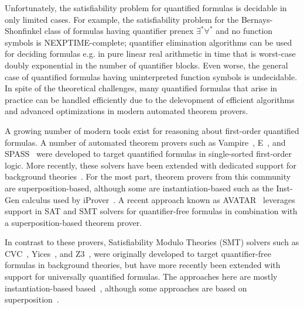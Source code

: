 \documentclass[oribibl]{llncs}
\begin{document}
Unfortunately, the satisfiability problem for quantified formulas is decidable in only limited cases.
For example,
the satisfiability problem for the Bernays-Shonfinkel class of formulas
having quantifier prenex $\exists^\ast \forall^\ast$ and no function symbols
is NEXPTIME-complete;
quantifier elimination algorithms can be used for deciding 
formulas e.g. in pure linear real arithmetic in time that is worst-case doubly exponential in the number of quantifier blocks.
Even worse, the general case of quantified formulas having uninterpreted function symbols is undecidable.
In spite of the theoretical challenges, many quantified formulas that arise in practice
can be handled efficiently due to the delevopment of efficient algorithms 
and advanced optimizations in modern automated theorem provers.

A growing number of modern tools exist for reasoning about first-order quantified formulas.
A number of automated theorem provers
such as Vampire~\cite{DBLP:conf/cav/KovacsV13}, E~\cite{schulz2002brainiac}, and SPASS~\cite{weidenbach2009spass}
were developed to target quantified formulas in single-sorted first-order logic.
More recently, these solvers have been extended with dedicated support for background theories~\cite{DBLP:conf/frocos/AlthausKW09,DBLP:conf/cade/BaumgartnerBW15}.
For the most part, theorem provers from this community are superposition-based,
although some are instantiation-based such as the Inst-Gen calculus used by iProver~\cite{ganzinger2003new}.
A recent approach known as AVATAR~\cite{DBLP:conf/cade/RegerSV15} leverages support in SAT and SMT solvers for quantifier-free formulas
in combination with a superposition-based theorem prover.

In contrast to these provers, Satisfiability Modulo Theories (SMT) solvers such as CVC~\cite{stump2002cvc}, Yices~\cite{dutertre2006yices}, and Z3~\cite{Z3}, 
were originally developed to target quantifier-free formulas in background theories,
but have more recently been extended with support for universally quantified formulas.
The approaches here are mostly instantiation-based based~\cite{Detlefs03simplify:a,MouraBjoerner07,GeBarrettTinelli07},
although some approaches are based on superposition~\cite{de2008engineering}.
\end{document}
